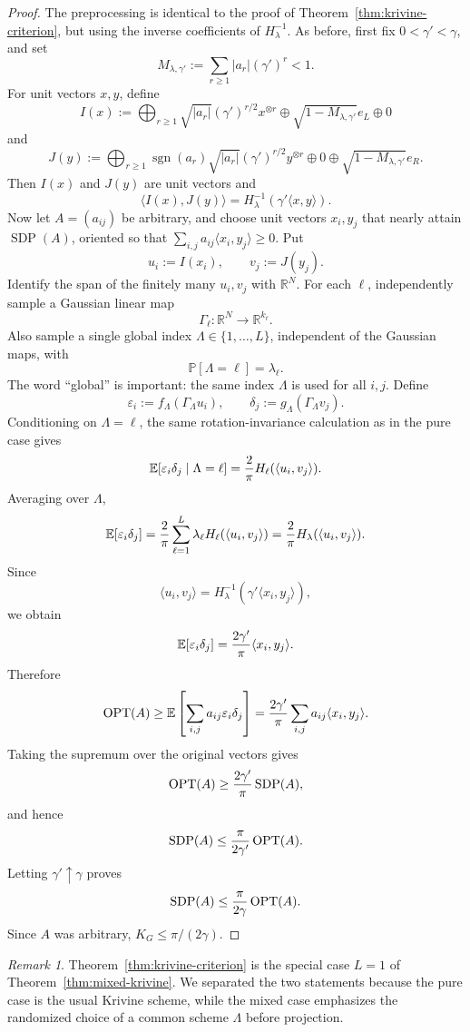 \documentclass[11pt]{article}
\newcommand{\R}{\mathbb R}
\newcommand{\E}{\mathbb E}
\newcommand{\Prob}{\mathbb P}
\newcommand{\1}{\mathbf 1}
\newcommand{\sgn}{\operatorname{sgn}}
\newcommand{\ip}[2]{\langle #1,#2\rangle}
\newcommand{\KG}{K_G}
\newcommand{\SDP}{\operatorname{SDP}}
\newcommand{\OPT}{\operatorname{OPT}}
\newcommand{\eps}{\varepsilon}
\theoremstyle{plain}
\theoremstyle{definition}
\theoremstyle{remark}
\newtheorem{remark}[theorem]{Remark}
\begin{document}
\begin{proof}
The preprocessing is identical to the proof of Theorem~\ref{thm:krivine-criterion}, but using the inverse coefficients of $H_\lambda^{-1}$.  As before, first fix $0<\gamma'<\gamma$, and set
\[
  M_{\lambda,\gamma'}:=\sum_{r\ge1}|a_r|(\gamma')^r<1.
\]
For unit vectors $x,y$, define
\[
  I(x):=\bigoplus_{r\ge1}\sqrt{|a_r|}(\gamma')^{r/2}x^{\otimes r}
  \oplus \sqrt{1-M_{\lambda,\gamma'}}e_L\oplus0
\]
and
\[
  J(y):=\bigoplus_{r\ge1}\sgn(a_r)\sqrt{|a_r|}(\gamma')^{r/2}y^{\otimes r}
  \oplus0\oplus\sqrt{1-M_{\lambda,\gamma'}}e_R.
\]
Then $I(x)$ and $J(y)$ are unit vectors and
\[
  \ip{I(x)}{J(y)}=H_\lambda^{-1}(\gamma'\ip{x}{y}).
\]
Now let $A=(a_{ij})$ be arbitrary, and choose unit vectors $x_i,y_j$ that nearly attain $\SDP(A)$, oriented so that $\sum_{i,j}a_{ij}\ip{x_i}{y_j}\ge0$.  Put
\[
  u_i:=I(x_i),\qquad v_j:=J(y_j).
\]
Identify the span of the finitely many $u_i,v_j$ with $\R^N$.  For each $\ell$, independently sample a Gaussian linear map
\[
  \Gamma_\ell:\R^N\to\R^{k_\ell}.
\]
Also sample a single global index $\Lambda\in\{1,\ldots,L\}$, independent of the Gaussian maps, with
\[
  \Prob[\Lambda=\ell]=\lambda_\ell.
\]
The word ``global'' is important: the same index $\Lambda$ is used for all $i,j$.  Define
\[
  \eps_i:=f_\Lambda(\Gamma_\Lambda u_i),
  \qquad
  \delta_j:=g_\Lambda(\Gamma_\Lambda v_j).
\]
Conditioning on $\Lambda=\ell$, the same rotation-invariance calculation as in the pure case gives
\[
  \E[\eps_i\delta_j\mid \Lambda=\ell]={2\over\pi}H_\ell(\ip{u_i}{v_j}).
\]
Averaging over $\Lambda$,
\[
  \E[\eps_i\delta_j]={2\over\pi}\sum_{\ell=1}^L\lambda_\ell H_\ell(\ip{u_i}{v_j})
  ={2\over\pi}H_\lambda(\ip{u_i}{v_j}).
\]
Since
\[
  \ip{u_i}{v_j}=H_\lambda^{-1}(\gamma'\ip{x_i}{y_j}),
\]
we obtain
\[
  \E[\eps_i\delta_j]={2\gamma'\over\pi}\ip{x_i}{y_j}.
\]
Therefore
\[
  \OPT(A)\ge
  \E\left[\sum_{i,j}a_{ij}\eps_i\delta_j\right]
  ={2\gamma'\over\pi}\sum_{i,j}a_{ij}\ip{x_i}{y_j}.
\]
Taking the supremum over the original vectors gives
\[
  \OPT(A)\ge {2\gamma'\over\pi}\SDP(A),
\]
and hence
\[
  \SDP(A)\le {\pi\over2\gamma'}\OPT(A).
\]
Letting $\gamma'\uparrow\gamma$ proves
\[
  \SDP(A)\le {\pi\over2\gamma}\OPT(A).
\]
Since $A$ was arbitrary, $\KG\le \pi/(2\gamma)$.
\end{proof}

\begin{remark}
Theorem~\ref{thm:krivine-criterion} is the special case $L=1$ of Theorem~\ref{thm:mixed-krivine}.  We separated the two statements because the pure case is the usual Krivine scheme, while the mixed case emphasizes the randomized choice of a common scheme $\Lambda$ before projection.
\end{remark}
\end{document}
